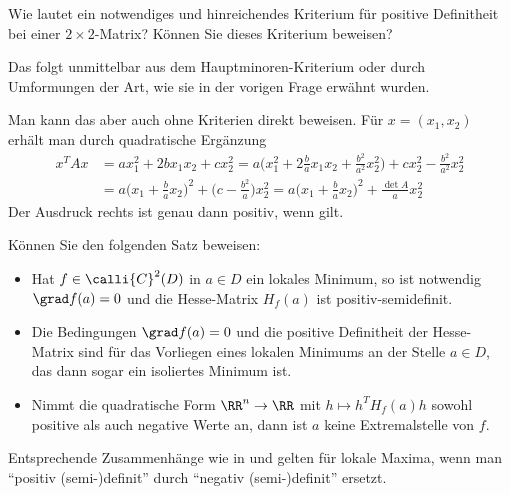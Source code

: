 \begin{frage}
  Wie lautet ein notwendiges und hinreichendes Kriterium 
  für positive Definitheit bei einer $2\times 2 $-Matrix? 
  Können Sie dieses Kriterium beweisen?
\end{frage}

\begin{antwort}
  Das folgt unmittelbar aus dem Hauptminoren-Kriterium oder durch 
  Umformungen der Art, wie sie in der vorigen Frage erwähnt wurden. 

  Man kann das aber auch ohne Kriterien direkt beweisen. 
  Für $x=(x_1,x_2)$ erhält man durch quadratische Ergänzung
  \begin{align*}
    x^T A x &= ax_1^2 + 2bx_1 x_2 + cx_2^2 
    = a \bigg( x_1^2 + 2\frac{b}{a} x_1 x_2 + \frac{b^2}{a^2} x_2^2 \bigg)   
    +cx_2^2 - \frac{b^2}{a^2} x_2^2 \\
    &= a \bigg( x_1 + \frac{b}{a} x_2 \bigg)^2 + \bigg( c-\frac{b^2}{a} \bigg)
    x_2^2 = 
    a \bigg( x_1 + \frac{b}{a} x_2 \bigg)^2 + \frac{\det A}{a} 
    x_2^2
  \end{align*}
  Der Ausdruck rechts ist genau dann positiv, wenn {\astref} gilt.\AntEnd
\end{antwort}

\begin{frage}\label{10_extremkrit}
  Können Sie den folgenden Satz beweisen:
  \begin{itemize}[1mm]
  \item[\desc{a}] Hat $f\in\calli{C}^2(D)$ in $a\in D$ ein lokales 
    Minimum, so ist notwendig $\grad f(a)=0$ und die Hesse-Matrix 
    $H_f(a)$ ist positiv-semidefinit.
  \item[\desc{b}] Die Bedingungen $\grad f(a)=0$ und die positive Definitheit 
    der Hesse-Matrix sind  für das Vorliegen eines 
    lokalen Minimums an der Stelle $a\in D$, das dann sogar ein isoliertes 
    Minimum ist.
  \item[\desc{c}] Nimmt die quadratische Form $\RR^n \to \RR$ mit 
    $h \mapsto h^T H_f(a) h$ sowohl positive als auch negative Werte an, dann 
    ist $a$ keine Extremalstelle von $f$. 
  \end{itemize}
  Entsprechende Zusammenhänge wie in  und  gelten 
  für lokale Maxima, wenn man "`positiv (semi-)definit"' durch 
  "`negativ (semi-)definit"' ersetzt.
\end{frage}

